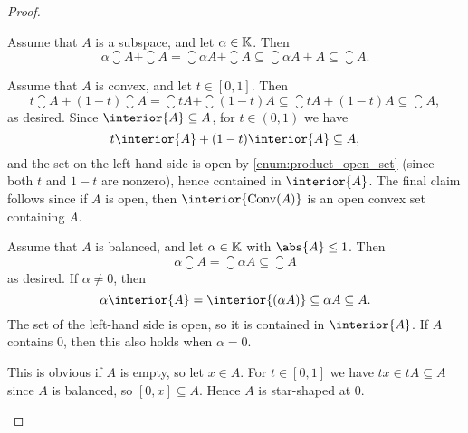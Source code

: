 \documentclass[article, a4paper, 11pt, oneside]{memoir}
\numberwithin{equation}{chapter}
\begin{document}
\begin{proof}
\begin{proofsec}
    \item[Proof of \subcref{enum:closure-of-subspace}]
    Assume that $A$ is a subspace, and let $\alpha \in \mathbb{K}$. Then
    \begin{equation*}
        \alpha \closure{A} + \closure{A}
            = \closure{\alpha A} + \closure{A}
            \subseteq \closure{\alpha A + A}
            \subseteq \closure{A}.
    \end{equation*}
    
    \item[Proof of \subcref{enum:convex-closure-interior}]
    Assume that $A$ is convex, and let $t \in [0,1]$. Then
    \begin{equation*}
        t \closure{A} + (1-t) \closure{A}
            = \closure{tA} + \closure{(1-t)A}
            \subseteq \closure{tA + (1-t)A}
            \subseteq \closure{A},
    \end{equation*}
    as desired. Since $\interior{A} \subseteq A$, for $t \in (0,1)$ we have
    \begin{equation*}
        t \interior{A} + (1-t) \interior{A}
            \subseteq A,
    \end{equation*}
    and the set on the left-hand side is open by \cref{enum:product_open_set} (since both $t$ and $1-t$ are nonzero), hence contained in $\interior{A}$. The final claim follows since if $A$ is open, then $\interior{\conv(A)}$ is an open convex set containing $A$.

    \item[Proof of \subcref{enum:balanced-closure-interior}]
    Assume that $A$ is balanced, and let $\alpha \in \mathbb{K}$ with $\abs{A} \leq 1$. Then
    \begin{equation*}
        \alpha \closure{A}
            = \closure{\alpha A}
            \subseteq \closure{A}
    \end{equation*}
    as desired. If $\alpha \neq 0$, then
    \begin{equation*}
        \alpha \interior{A}
            = \interior{(\alpha A)}
            \subseteq \alpha A
            \subseteq A.
    \end{equation*}
    The set of the left-hand side is open, so it is contained in $\interior{A}$. If $A$ contains $0$, then this also holds when $\alpha = 0$.

    \item[Proof of \subcref{enum:balanced-implies-connected}]
    This is obvious if $A$ is empty, so let $x \in A$. For $t \in [0,1]$ we have $tx \in tA \subseteq A$ since $A$ is balanced, so $[0,x] \subseteq A$. Hence $A$ is star-shaped at $0$.
    

\end{proofsec}
\end{proof}
\end{document}
